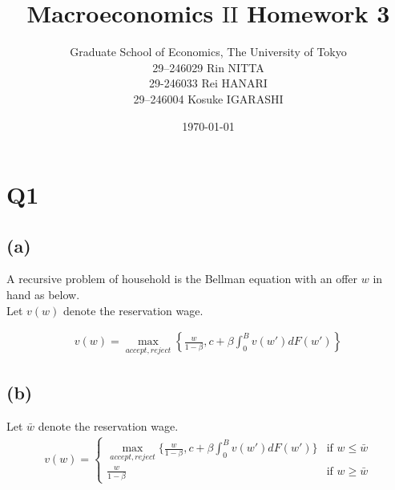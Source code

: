 \documentclass{ltjsarticle}
\title{Macroeconomics $\mathrm{II}$ Homework 3}
\date{\today}
\author{Graduate School of Economics, The University of Tokyo\\[4mm]29--246029 Rin NITTA\\ 29-246033 Rei HANARI \\ 29--246004 Kosuke IGARASHI}
\begin{document}
\maketitle

\section*{Q1}
\subsection*{(a)}
A recursive problem of household is the Bellman equation with an offer $w$ in hand as below.\\
Let $v(w)$ denote the reservation wage.

\begin{gather*}
  v(w) = \max_{accept, reject} \left\{ \frac{w}{1 - \beta}, c + \beta \int^B_0 v(w')dF(w') \right\} 
\end{gather*}

\subsection*{(b)}
Let $\bar{w}$ denote the reservation wage.
\begin{align*}
    v(w) = 
    \begin{cases}
      \max_{accept, reject} \{ \frac{w}{1 - \beta}, c + \beta \int^B_0 v(w')dF(w') \} & \text{if } w \leq \bar{w}  \\
      \frac{w}{1 - \beta} & \text{if } w \geq \bar{w}
    \end{cases}
\end{align*}
\end{document}
